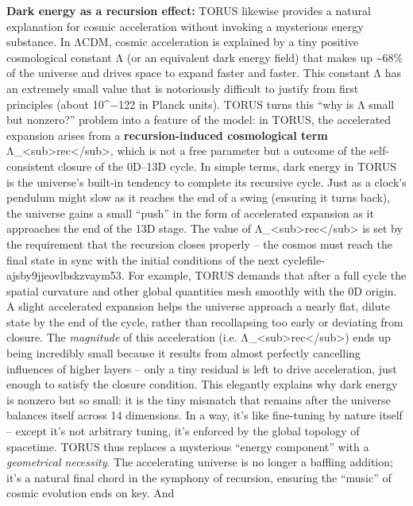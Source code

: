 \documentclass[]{article}
\begin{document}
\textbf{Dark energy as a recursion effect:} TORUS likewise provides a
natural explanation for cosmic acceleration without invoking a
mysterious energy substance. In ΛCDM, cosmic acceleration is explained
by a tiny positive cosmological constant Λ (or an equivalent dark energy
field) that makes up \textasciitilde{}68\% of the universe and drives
space to expand faster and faster. This constant Λ has an extremely
small value that is notoriously difficult to justify from first
principles (about 10\^{}−122 in Planck units)​. TORUS turns this ``why
is Λ small but nonzero?'' problem into a feature of the model: in TORUS,
the accelerated expansion arises from a \textbf{recursion-induced
cosmological term}
Λ\_\textless{}sub\textgreater{}rec\textless{}/sub\textgreater{}, which
is not a free parameter but a outcome of the self-consistent closure of
the 0D--13D cycle​. In simple terms, dark energy in TORUS is the
universe's built-in tendency to complete its recursive cycle. Just as a
clock's pendulum might slow as it reaches the end of a swing (ensuring
it turns back), the universe gains a small ``push'' in the form of
accelerated expansion as it approaches the end of the 13D stage. The
value of Λ\_\textless{}sub\textgreater{}rec\textless{}/sub\textgreater{}
is set by the requirement that the recursion closes properly -- the
cosmos must reach the final state in sync with the initial conditions of
the next cycle​file-ajsby9jjeovlbskzvaym53​. For example, TORUS demands
that after a full cycle the spatial curvature and other global
quantities mesh smoothly with the 0D origin. A slight accelerated
expansion helps the universe approach a nearly flat, dilute state by the
end of the cycle, rather than recollapsing too early or deviating from
closure​. The \emph{magnitude} of this acceleration (i.e.
Λ\_\textless{}sub\textgreater{}rec\textless{}/sub\textgreater{}) ends up
being incredibly small because it results from almost perfectly
cancelling influences of higher layers -- only a tiny residual is left
to drive acceleration, just enough to satisfy the closure condition​.
This elegantly explains why dark energy is nonzero but so small: it is
the tiny mismatch that remains after the universe balances itself across
14 dimensions. In a way, it's like fine-tuning by nature itself --
except it's not arbitrary tuning, it's enforced by the global topology
of spacetime. TORUS thus replaces a mysterious ``energy component'' with
a \emph{geometrical necessity}. The accelerating universe is no longer a
baffling addition; it's a natural final chord in the symphony of
recursion, ensuring the ``music'' of cosmic evolution ends on key. And
\end{document}
